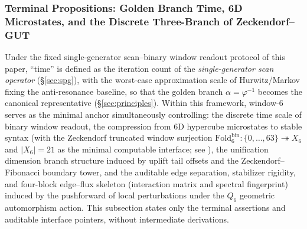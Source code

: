 \subsubsection{Terminal Propositions: Golden Branch Time, 6D Microstates, and the Discrete Three-Branch of Zeckendorf--GUT}
\label{subsubsec:window6-terminal-propositions}

Under the fixed single-generator scan--binary window readout protocol of this paper, ``time'' is defined as the iteration count of the \emph{single-generator scan operator} (\S\ref{sec:spg}), with the worst-case approximation scale of Hurwitz/Markov fixing the anti-resonance baseline, so that the golden branch \(\alpha=\varphi^{-1}\) becomes the canonical representative (\S\ref{sec:principles}).
Within this framework, window-\(6\) serves as the minimal anchor simultaneously controlling: the discrete time scale of binary window readout, the compression from 6D hypercube microstates to stable syntax (with the Zeckendorf truncated window surjection \(\mathrm{Fold}^{\mathrm{bin}}_6:\{0,\dots,63\}\twoheadrightarrow X_6\) and \(|X_6|=21\) as the minimal computable interface; see \cite{Internal2025ResolutionFoldingPhiPi}), the unification dimension branch structure induced by uplift tail offsets and the Zeckendorf--Fibonacci boundary tower, and the auditable edge separation, stabilizer rigidity, and four-block edge--flux skeleton (interaction matrix and spectral fingerprint) induced by the pushforward of local perturbations under the \(Q_6\) geometric automorphism action.
This subsection states only the terminal assertions and auditable interface pointers, without intermediate derivations.

